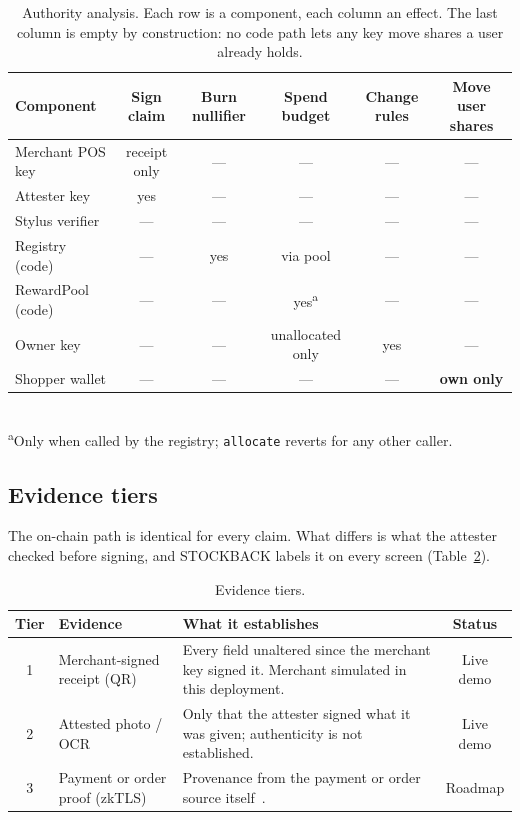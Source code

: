\documentclass[10.5pt,letterpaper]{article}
\theoremstyle{definition}
\theoremstyle{remark}
\newcommand{\ttt}[1]{\texttt{#1}}
\begin{document}
\begin{table}[!htb]
\centering\small
\caption{Authority analysis. Each row is a component, each column an effect. The last column is empty by
construction: no code path lets any key move shares a user already holds.}
\label{tab:authority}
\begin{tabular}{@{}lccccc@{}}
\toprule
Component & Sign claim & Burn nullifier & Spend budget & Change rules & Move user shares\\
\midrule
Merchant POS key   & receipt only & --- & --- & --- & ---\\
Attester key       & yes & --- & --- & --- & ---\\
Stylus verifier    & --- & --- & --- & --- & ---\\
Registry (code)    & --- & yes & via pool & --- & ---\\
RewardPool (code)  & --- & --- & yes\textsuperscript{a} & --- & ---\\
Owner key          & --- & --- & unallocated only & yes & ---\\
Shopper wallet     & --- & --- & --- & --- & \textbf{own only}\\
\bottomrule
\end{tabular}\\[3pt]
\footnotesize\textsuperscript{a}Only when called by the registry; \ttt{allocate} reverts for any other caller.
\end{table}

\subsection{Evidence tiers}
The on-chain path is identical for every claim. What differs is what the attester checked before signing, and
STOCKBACK labels it on every screen (Table~\ref{tab:tiers}).

\begin{table}[H]
\centering\small
\caption{Evidence tiers.}
\label{tab:tiers}
\begin{tabularx}{\textwidth}{@{}c>{\raggedright}p{3.3cm}>{\raggedright}Xc@{}}
\toprule
Tier & Evidence & What it establishes & Status\\
\midrule
1 & Merchant-signed receipt (QR) & Every field unaltered since the merchant key signed it. Merchant simulated in this deployment. & Live demo\\
2 & Attested photo / OCR & Only that the attester signed what it was given; authenticity is not established. & Live demo\\
3 & Payment or order proof (zkTLS) & Provenance from the payment or order source itself~\cite{zhang2020deco}. & Roadmap\\
\bottomrule
\end{tabularx}
\end{table}
\end{document}
